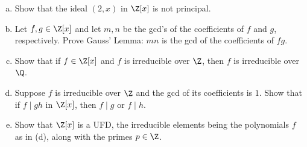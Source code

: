 \documentclass[11pt,letterpaper]{article}
\begin{document}
\begin{cproblem}{3.8}\noindent
    \begin{enumerate}[(a)]
        \item Show that the ideal $(2,x)$ in $\Z[x]$ is not principal.
        \item Let $f,g\in \Z[x]$ and let $m,n$ be the gcd's of the coefficients of $f$ and $g$, respectively. Prove Gauss' Lemma: $mn$ is the gcd of the coefficients of $fg$. %
        \item Show that if $f\in \Z[x]$ and $f$ is irreducible over $\Z$, then $f$ is irreducible over $\Q$.
        \item Suppose $f$ is irreducible over $\Z$ and the gcd of its coefficients is $1$. Show that if $f \mid gh$ in $\Z[x]$, then $f \mid g$ or $f \mid h$.
        \item Show that $\Z[x]$ is a UFD, the irreducible elements being the polynomials $f$ as in (d), along with the primes $p\in \Z$.
    \end{enumerate}
\end{cproblem}
\end{document}

